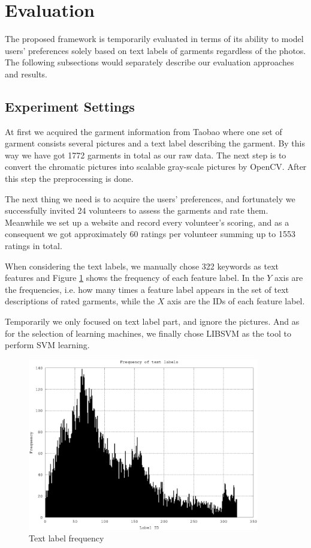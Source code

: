 \section{Evaluation}\label{sec:eval}
The proposed framework is temporarily evaluated in terms of its ability to model users' preferences solely based on text labels of garments regardless of the photos. The following subsections would separately describe our evaluation approaches and results.

\subsection{Experiment Settings}
At first we acquired the garment information from Taobao where one set of garment consists several pictures and a text label describing the garment. By this way we have got 1772 garments in total as our raw data. The next step is to convert the chromatic pictures into scalable gray-scale pictures by OpenCV. After this step the preprocessing is done. 
 
The next thing we need is to acquire the users' preferences, and fortunately we successfully invited 24 volunteers to assess the garments and rate them. Meanwhile we set up a website and record every volunteer's scoring, and as a consequent we got approximately 60 ratings per volunteer summing up to 1553 ratings in total.

When considering the text labels, we manually chose 322 keywords as text features and Figure \ref{fig:freq} shows the frequency of each feature label. In the $Y$ axis are the frequencies, i.e. how many times a feature label appears in the set of text descriptions of rated garments, while the $X$ axis are the IDs of each feature label.

Temporarily we only focused on text label part, and ignore the pictures. And as for the selection of learning machines, we finally chose LIBSVM \cite{CC01a} as the tool to perform SVM learning.

\begin{figure}
  \centering
  \includegraphics[width=0.9\textwidth]{frequency}
  \caption{Text label frequency}
  \label{fig:freq}
\end{figure}

